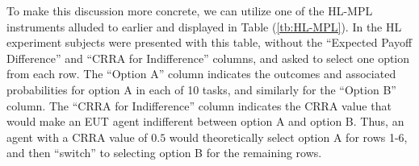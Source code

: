 \documentclass[../main.tex]{subfiles}
\begin{document}


To make this discussion more concrete, we can utilize one of the HL-MPL instruments alluded to earlier and displayed in Table (\ref{tb:HL-MPL}).
In the HL experiment subjects were presented with this table, without the \enquote{Expected Payoff Difference} and \enquote{CRRA for Indifference} columns, and asked to select one option from each row.
The \enquote{Option A} column indicates the outcomes and associated probabilities for option A in each of 10 tasks, and similarly for the \enquote{Option B} column.
The \enquote{CRRA for Indifference} column indicates the CRRA value that would make an EUT agent indifferent between option A and option B.
Thus, an agent with a CRRA value of $0.5$ would theoretically select option A for rows 1-6, and then \enquote{switch} to selecting option B for the remaining rows.
\end{document}
